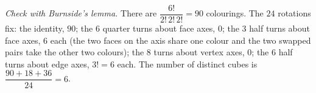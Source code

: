 \emph{Check with Burnside's lemma.} There are $\dfrac{6!}{2!\,2!\,2!}=90$ colourings. The $24$ rotations fix: the identity, $90$; the $6$ quarter turns about face axes, $0$; the $3$ half turns about face axes, $6$ each (the two faces on the axis share one colour and the two swapped pairs take the other two colours); the $8$ turns about vertex axes, $0$; the $6$ half turns about edge axes, $3!=6$ each. The number of distinct cubes is $\dfrac{90+18+36}{24}=6$.
